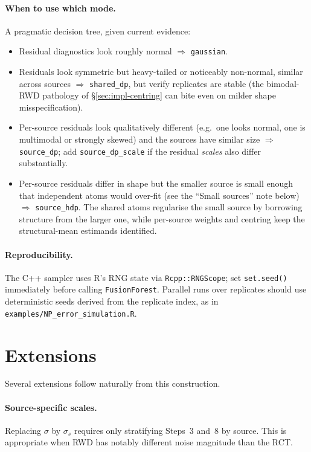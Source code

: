 \documentclass[11pt]{article}
\newcommand{\1}{\mathbf{1}}
\begin{document}
\paragraph{When to use which mode.} A pragmatic decision tree, given current evidence:
\begin{itemize}[noitemsep]
  \item Residual diagnostics look roughly normal $\Rightarrow$ \texttt{gaussian}.
  \item Residuals look symmetric but heavy-tailed or noticeably non-normal, similar across sources $\Rightarrow$ \texttt{shared\_dp}, but verify replicates are stable (the bimodal-RWD pathology of \S\ref{sec:impl-centring} can bite even on milder shape misspecification).
  \item Per-source residuals look qualitatively different (e.g.\ one looks normal, one is multimodal or strongly skewed) and the sources have similar size $\Rightarrow$ \texttt{source\_dp}; add \texttt{source\_dp\_scale} if the residual \emph{scales} also differ substantially.
  \item Per-source residuals differ in shape but the smaller source is small enough that independent atoms would over-fit (see the ``Small sources'' note below) $\Rightarrow$ \texttt{source\_hdp}. The shared atoms regularise the small source by borrowing structure from the larger one, while per-source weights and centring keep the structural-mean estimands identified.
\end{itemize}

\paragraph{Reproducibility.} The C++ sampler uses R's RNG state via \texttt{Rcpp::RNGScope}; set \texttt{set.seed()} immediately before calling \texttt{FusionForest}. Parallel runs over replicates should use deterministic seeds derived from the replicate index, as in \texttt{examples/NP\_error\_simulation.R}.

\section{Extensions}\label{sec:extensions}

Several extensions follow naturally from this construction.

\paragraph{Source-specific scales.} Replacing $\sigma$ by $\sigma_s$ requires only stratifying Steps~3 and~8 by source. This is appropriate when RWD has notably different noise magnitude than the RCT.
\end{document}
